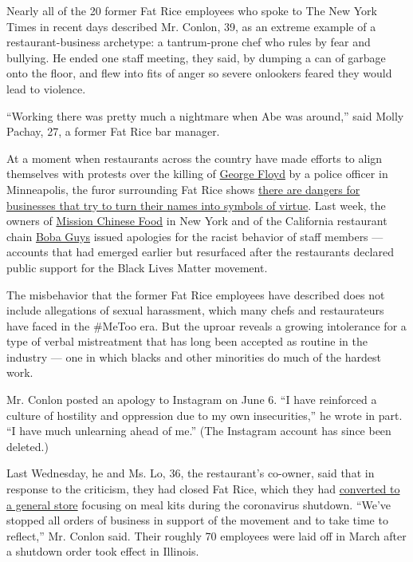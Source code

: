 Nearly all of the 20 former Fat Rice employees who spoke to The New York
Times in recent days described Mr. Conlon, 39, as an extreme example of
a restaurant-business archetype: a tantrum-prone chef who rules by fear
and bullying. He ended one staff meeting, they said, by dumping a can of
garbage onto the floor, and flew into fits of anger so severe onlookers
feared they would lead to violence.

``Working there was pretty much a nightmare when Abe was around,'' said
Molly Pachay, 27, a former Fat Rice bar manager.

At a moment when restaurants across the country have made efforts to
align themselves with protests over the killing of
\href{https://www.nytimes.com/article/george-floyd-who-is.html}{George
Floyd} by a police officer in Minneapolis, the furor surrounding Fat
Rice shows
\href{https://www.nytimes.com/2020/06/11/dining/food-brands-black-lives-matter-social-media.html}{there
are dangers for businesses that try to turn their names into symbols of
virtue}. Last week, the owners of
\href{https://ny.eater.com/2020/6/8/21284326/mission-chinese-race-danny-bowien}{Mission
Chinese Food} in New York and of the California restaurant chain
\href{https://www.sfgate.com/food/article/Boba-Guys-fires-manager-for-racist-comments-15330946.php}{Boba
Guys} issued apologies for the racist behavior of staff members ---
accounts that had emerged earlier but resurfaced after the restaurants
declared public support for the Black Lives Matter movement.

The misbehavior that the former Fat Rice employees have described does
not include allegations of sexual harassment, which many chefs and
restaurateurs have faced in the \#MeToo era. But the uproar reveals a
growing intolerance for a type of verbal mistreatment that has long been
accepted as routine in the industry --- one in which blacks and other
minorities do much of the hardest work.

Mr. Conlon posted an apology to Instagram on June 6. ``I have reinforced
a culture of hostility and oppression due to my own insecurities,'' he
wrote in part. ``I have much unlearning ahead of me.'' (The Instagram
account has since been deleted.)

Last Wednesday, he and Ms. Lo, 36, the restaurant's co-owner, said that
in response to the criticism, they had closed Fat Rice, which they had
\href{https://www.nytimes.com/2020/04/28/dining/super-fat-rice-mart-chicago-coronavirus.html}{converted
to a general store} focusing on meal kits during the coronavirus
shutdown. ``We've stopped all orders of business in support of the
movement and to take time to reflect,'' Mr. Conlon said. Their roughly
70 employees were laid off in March after a shutdown order took effect
in Illinois.

